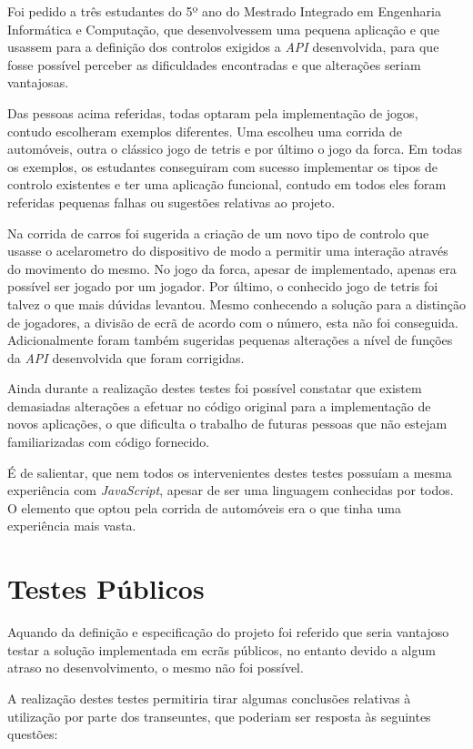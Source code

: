 	Foi pedido a três estudantes do 5º ano do Mestrado Integrado em Engenharia Informática e Computação, que desenvolvessem uma pequena aplicação e que usassem para a definição dos controlos exigidos a \textit{API} desenvolvida, para que fosse possível perceber as dificuldades encontradas e que alterações seriam vantajosas. 

	Das pessoas acima referidas, todas optaram pela implementação de jogos, contudo escolheram exemplos diferentes. Uma escolheu uma corrida de automóveis, outra o clássico jogo de tetris e por último o jogo da forca. Em todas os exemplos, os estudantes conseguiram com sucesso implementar os tipos de controlo existentes e ter uma aplicação funcional, contudo em todos eles foram referidas pequenas falhas ou sugestões relativas ao projeto.

	Na corrida de carros foi sugerida a criação de um novo tipo de controlo que usasse o acelarometro do dispositivo de modo a permitir uma interação através do movimento do mesmo. No jogo da forca, apesar de implementado, apenas era possível ser jogado por um jogador. 
	Por último, o conhecido jogo de tetris foi talvez o que mais dúvidas levantou. Mesmo conhecendo a  solução para a distinção de jogadores, a divisão de ecrã de acordo com o número, esta não foi conseguida. Adicionalmente foram também sugeridas pequenas alterações a nível de funções da \textit{API} desenvolvida que foram corrigidas.

	Ainda durante a realização destes testes foi possível constatar que existem demasiadas alterações a efetuar no código original para a implementação de novos aplicações, o que dificulta o trabalho de futuras pessoas que não estejam familiarizadas com código fornecido.

	É de salientar, que nem todos os intervenientes destes testes possuíam a mesma experiência com \textit{JavaScript}, apesar de ser uma linguagem conhecidas por todos. O elemento que optou pela corrida de automóveis era o que tinha uma experiência mais vasta.

\section{Testes Públicos}

	Aquando da definição e especificação do projeto foi referido que seria vantajoso testar a solução implementada em ecrãs públicos, no entanto devido a algum atraso no desenvolvimento, o mesmo não foi possível.

	A realização destes testes permitiria tirar algumas conclusões relativas à utilização por parte dos transeuntes, que poderiam ser resposta às seguintes questões:

